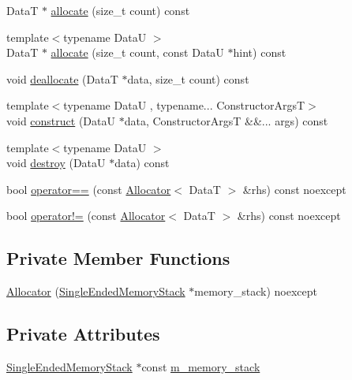 \begin{DoxyCompactItemize}
\item 
DataT $\ast$ \hyperlink{structmage_1_1_single_ended_memory_stack_1_1_allocator_a076727a4db2bd233d80ccbc5f01b84e5}{allocate} (size\+\_\+t count) const
\item 
{\footnotesize template$<$typename DataU $>$ }\\DataT $\ast$ \hyperlink{structmage_1_1_single_ended_memory_stack_1_1_allocator_acb4668453cf1850d3986d6a0f1b2dfec}{allocate} (size\+\_\+t count, const DataU $\ast$hint) const
\item 
void \hyperlink{structmage_1_1_single_ended_memory_stack_1_1_allocator_a29b4540dd5e0740e6ab99e26e162dafd}{deallocate} (DataT $\ast$data, size\+\_\+t count) const
\item 
{\footnotesize template$<$typename DataU , typename... Constructor\+ArgsT$>$ }\\void \hyperlink{structmage_1_1_single_ended_memory_stack_1_1_allocator_a87ef0a827c34c92f7df79daddc1a30ff}{construct} (DataU $\ast$data, Constructor\+ArgsT \&\&... args) const
\item 
{\footnotesize template$<$typename DataU $>$ }\\void \hyperlink{structmage_1_1_single_ended_memory_stack_1_1_allocator_ab2fe59e83fe573f39aa73389a08de2f9}{destroy} (DataU $\ast$data) const
\item 
bool \hyperlink{structmage_1_1_single_ended_memory_stack_1_1_allocator_aec97233e7d20f8edc93b4cedb8fac71c}{operator==} (const \hyperlink{structmage_1_1_single_ended_memory_stack_1_1_allocator}{Allocator}$<$ DataT $>$ \&rhs) const noexcept
\item 
bool \hyperlink{structmage_1_1_single_ended_memory_stack_1_1_allocator_a47f35477a04192175bc0f4ce737595fb}{operator!=} (const \hyperlink{structmage_1_1_single_ended_memory_stack_1_1_allocator}{Allocator}$<$ DataT $>$ \&rhs) const noexcept
\end{DoxyCompactItemize}
\subsection*{Private Member Functions}
\begin{DoxyCompactItemize}
\item 
\hyperlink{structmage_1_1_single_ended_memory_stack_1_1_allocator_a991173b1fccf74994dc9298b3cffb795}{Allocator} (\hyperlink{classmage_1_1_single_ended_memory_stack}{Single\+Ended\+Memory\+Stack} $\ast$memory\+\_\+stack) noexcept
\end{DoxyCompactItemize}
\subsection*{Private Attributes}
\begin{DoxyCompactItemize}
\item 
\hyperlink{classmage_1_1_single_ended_memory_stack}{Single\+Ended\+Memory\+Stack} $\ast$const \hyperlink{structmage_1_1_single_ended_memory_stack_1_1_allocator_a15ef2935cbc1a207892f25148c05c45d}{m\+\_\+memory\+\_\+stack}
\end{DoxyCompactItemize}

